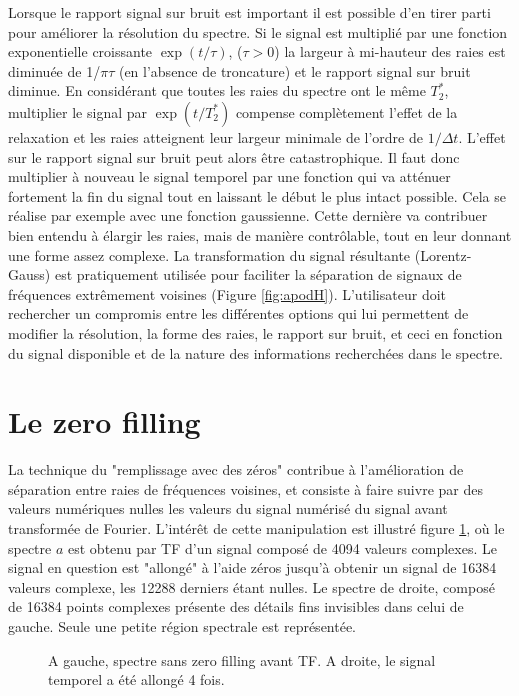 Lorsque le rapport signal sur bruit est important il est possible d'en tirer parti pour 
améliorer la résolution du spectre. 
Si le signal est multiplié par une fonction 
exponentielle croissante $\exp(t/\tau)$, ($\tau > 0$) 
la largeur à mi-hauteur des raies est diminuée de 1/$\pi\tau$ 
(en l'absence de troncature) et le rapport signal sur bruit diminue. 
En considérant que 
toutes les raies du spectre ont le même $T_2^*$, multiplier le signal par $\exp(t/T_2^*)$ 
compense complètement l'effet de la relaxation et les raies atteignent leur largeur 
minimale de l'ordre de $1/\Delta t$.
L'effet sur le rapport signal sur bruit peut alors être catastrophique.
Il faut donc multiplier à nouveau le signal temporel par une fonction
qui va atténuer fortement la fin
du signal tout en laissant le début le plus intact possible.
Cela se réalise par exemple avec une fonction gaussienne. 
Cette dernière va contribuer
bien entendu à élargir les raies, mais de manière contrôlable, tout en leur
donnant une forme assez complexe.
La transformation du signal résultante (Lorentz-Gauss) est pratiquement utilisée pour
faciliter la séparation de signaux de fréquences extrêmement voisines
(Figure \ref{fig:apodH}).
L'utilisateur doit rechercher un compromis entre les différentes
options qui lui permettent de modifier la résolution, la forme des raies, le
rapport sur bruit, et ceci en fonction du signal disponible et de la nature
des informations recherchées dans le spectre.

\section{Le zero filling}
La technique du "remplissage avec des zéros" contribue à l'amélioration de séparation 
entre raies de fréquences voisines, et consiste à faire suivre par des valeurs numériques 
nulles les valeurs du signal numérisé du signal avant transformée de Fourier. 
L'intérêt de cette manipulation est illustré figure \ref{fig:zerofill}, 
où le spectre $a$ est obtenu par TF d'un signal 
composé de 4094 valeurs complexes. 
Le signal en question est "allongé" à l'aide zéros 
jusqu'à obtenir un signal de 16384 valeurs complexe, les 12288 derniers étant nulles. 
Le spectre de droite, composé de 16384 points complexes présente des détails fins invisibles dans 
celui de gauche. Seule une petite région spectrale est représentée.

\begin{figure}[hbt]
\begin{center}
\end{center}
\caption[Effet du zero-filling.]
{A gauche, spectre sans zero filling avant TF. A droite, le signal temporel a été allongé 4 fois.}
\label{fig:zerofill}
\end{figure}

